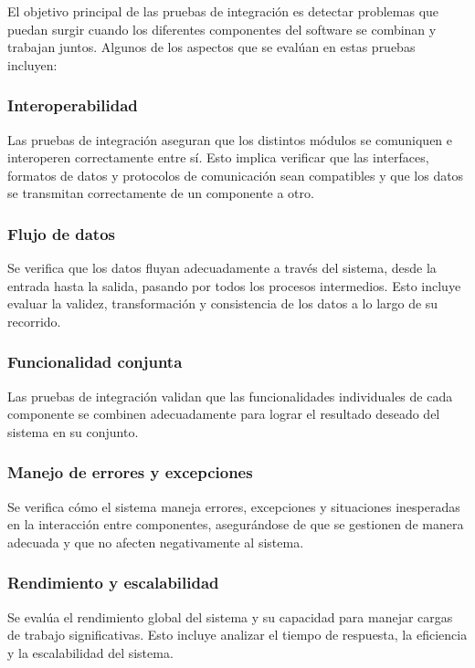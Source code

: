 \documentclass[executivepaper]{article}
\begin{document}
El objetivo principal de las pruebas de integración es detectar problemas que puedan surgir cuando los diferentes componentes del software se combinan y trabajan juntos. Algunos de los aspectos que se evalúan en estas pruebas incluyen:

\subsubsection*{Interoperabilidad}
Las pruebas de integración aseguran que los distintos módulos se comuniquen e interoperen correctamente entre sí. Esto implica verificar que las interfaces, formatos de datos y protocolos de comunicación sean compatibles y que los datos se transmitan correctamente de un componente a otro.

\subsubsection*{Flujo de datos}
Se verifica que los datos fluyan adecuadamente a través del sistema, desde la entrada hasta la salida, pasando por todos los procesos intermedios. Esto incluye evaluar la validez, transformación y consistencia de los datos a lo largo de su recorrido.

\subsubsection*{Funcionalidad conjunta}
Las pruebas de integración validan que las funcionalidades individuales de cada componente se combinen adecuadamente para lograr el resultado deseado del sistema en su conjunto.

\subsubsection*{Manejo de errores y excepciones}
Se verifica cómo el sistema maneja errores, excepciones y situaciones inesperadas en la interacción entre componentes, asegurándose de que se gestionen de manera adecuada y que no afecten negativamente al sistema.

\subsubsection*{Rendimiento y escalabilidad}
Se evalúa el rendimiento global del sistema y su capacidad para manejar cargas de trabajo significativas. Esto incluye analizar el tiempo de respuesta, la eficiencia y la escalabilidad del sistema.
\end{document}
